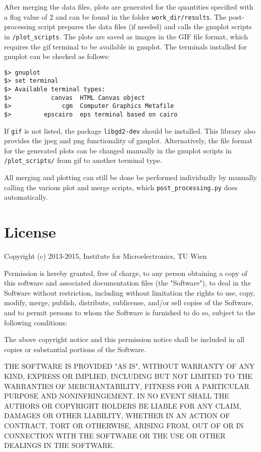 After merging the data files, plots are generated for the quantities specified with a flag value of 2 and can be found in the folder \texttt{work\_dir/results}. The post-processing script prepares the data files (if needed) and calls the gnuplot scripts in \texttt{/plot\_scripts}. The plots are saved as images in the GIF file format, which requires the gif terminal to be available in gnuplot. The terminals installed for gnuplot can be checked as follows:
\begin{lstlisting}
$> gnuplot
$> set terminal
$> Available terminal types:
$>           canvas  HTML Canvas object
$>              cgm  Computer Graphics Metafile
$>         epscairo  eps terminal based on cairo

\end{lstlisting}
If \texttt{gif} is not listed, the package \texttt{libgd2-dev} should be installed. This library also provides the jpeg and png functionality of gnuplot. Alternatively, the file format for the generated plots can be changed manually in the gnuplot scripts in \texttt{/plot\_scripts/} from gif to another terminal type.

All merging and plotting can still be done be performed individually by manually calling the various plot and merge scripts, which \texttt{post\_processing.py} does automatically.
\clearpage
\section{License}  %

Copyright (c) 2013-2015, Institute for Microelectronics, TU Wien

Permission is hereby granted, free of charge, to any person obtaining a copy
of this software and associated documentation files (the "Software"), to deal
in the Software without restriction, including without limitation the rights
to use, copy, modify, merge, publish, distribute, sublicense, and/or sell
copies of the Software, and to permit persons to whom the Software is
furnished to do so, subject to the following conditions:

The above copyright notice and this permission notice shall be included in
all copies or substantial portions of the Software.

THE SOFTWARE IS PROVIDED "AS IS", WITHOUT WARRANTY OF ANY KIND, EXPRESS OR
IMPLIED, INCLUDING BUT NOT LIMITED TO THE WARRANTIES OF MERCHANTABILITY,
FITNESS FOR A PARTICULAR PURPOSE AND NONINFRINGEMENT. IN NO EVENT SHALL THE
AUTHORS OR COPYRIGHT HOLDERS BE LIABLE FOR ANY CLAIM, DAMAGES OR OTHER
LIABILITY, WHETHER IN AN ACTION OF CONTRACT, TORT OR OTHERWISE, ARISING FROM,
OUT OF OR IN CONNECTION WITH THE SOFTWARE OR THE USE OR OTHER DEALINGS IN
THE SOFTWARE.
